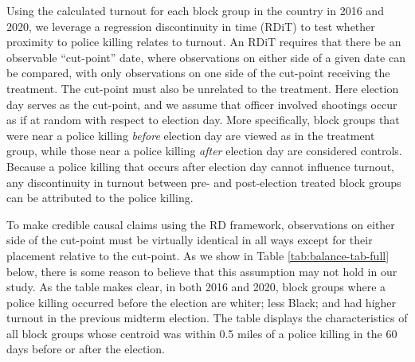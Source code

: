 \documentclass[12pt]{article}
\begin{document}
Using the calculated turnout for each block group in the country in 2016 and 2020, we leverage a regression discontinuity in time (RDiT) to test whether proximity to police killing relates to turnout. 
An RDiT requires that there be an observable ``cut-point'' date, where observations on either side of a given date can be compared, with only observations on one side of the cut-point receiving the treatment. The cut-point must also be unrelated to the treatment.
Here election day serves as the cut-point, and we assume that officer involved shootings occur as if at random with respect to election day. 
More specifically, block groups that were near a police killing \textit{before} election day are viewed as in the treatment group, while those near a police killing \textit{after} election day are considered controls. 
Because a police killing that occurs after election day cannot influence turnout, any discontinuity in turnout between pre- and post-election treated block groups can be attributed to the police killing. 

To make credible causal claims using the RD framework, observations on either side of the cut-point must be virtually identical in all ways except for their placement relative to the cut-point. As we show in Table \ref{tab:balance-tab-full} below, there is some reason to believe that this assumption may not hold in our study. As the table makes clear, in both 2016 and 2020, block groups where a police killing occurred before the election are whiter; less Black; and had higher turnout in the previous midterm election. The table displays the characteristics of all block groups whose centroid was within 0.5 miles of a police killing in the 60 days before or after the election.
\end{document}
